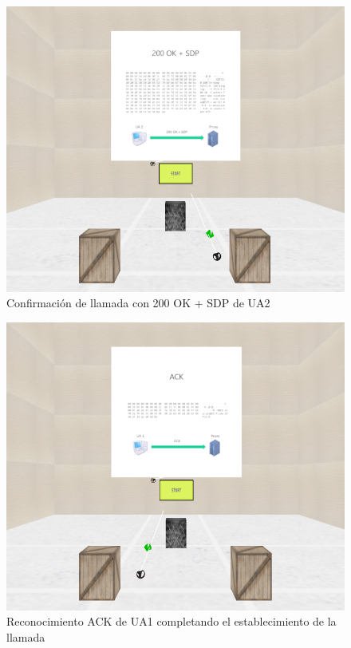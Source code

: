 \documentclass[a4paper, 12pt]{book}
\begin{document}
\begin{figure}
  \centering
  \includegraphics[width=12cm, keepaspectratio]{img/resultados/09-200OKSDP.png}
  \caption{Confirmación de llamada con 200 OK + SDP de UA2}
  \label{fig:09-200OKSDP}
\end{figure}

\begin{figure}
  \centering
  \includegraphics[width=12cm, keepaspectratio]{img/resultados/13-ACK.png}
  \caption{Reconocimiento ACK de UA1 completando el establecimiento de la llamada}
  \label{fig:13-ACK}
\end{figure}
\end{document}
